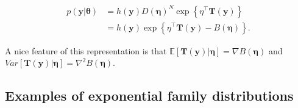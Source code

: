 \begin{align}
	p(\mathbf{y}|\mathbf{\theta})&=h(\mathbf{y})D(\mathbf{\eta})^N\exp\left\{\eta^{\top}\mathbf{T}(\mathbf{y})\right\}\nonumber\\
	&=h(\mathbf{y})\exp\left\{\eta^{\top}\mathbf{T}(\mathbf{y})-B(\mathbf{\eta})\right\}.\nonumber
\end{align}

A nice feature of this representation is that $\mathbb{E}[\mathbf{T}(\mathbf{y})|\mathbf{\eta}]=\nabla B(\mathbf{\eta})$ and $Var[\mathbf{T}(\mathbf{y})|\mathbf{\eta}]=\nabla^2 B(\mathbf{\eta})$. 

\subsection{Examples of exponential family distributions}

